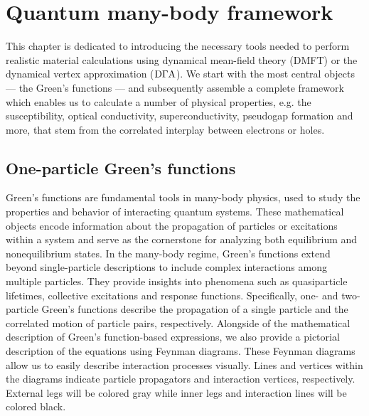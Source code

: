 \documentclass[../../main.tex]{subfiles}
\begin{document}
\sloppy

\chapter{Quantum many-body framework}\label{ch:quantum_many_body_framework}

This chapter is dedicated to introducing the necessary tools needed to perform realistic material calculations using dynamical mean-field theory (DMFT) or the dynamical vertex approximation ($\text{D}\Gamma\text{A}$). We start with the most central objects --- the Green's functions --- and subsequently assemble a complete framework which enables us to calculate a number of physical properties, e.g. the susceptibility, optical conductivity, superconductivity, pseudogap formation and more, that stem from the correlated interplay between electrons or holes.

\section{One-particle Green's functions}

Green's functions are fundamental tools in many-body physics, used to study the properties and behavior of interacting quantum systems. These mathematical objects encode information about the propagation of particles or excitations within a system and serve as the cornerstone for analyzing both equilibrium and nonequilibrium states. In the many-body regime, Green's functions extend beyond single-particle descriptions to include complex interactions among multiple particles. They provide insights into phenomena such as quasiparticle lifetimes, collective excitations and response functions. Specifically, one- and two-particle Green's functions describe the propagation of a single particle and the correlated motion of particle pairs, respectively. Alongside of the mathematical description of Green's function-based expressions, we also provide a pictorial description of the equations using Feynman diagrams. These Feynman diagrams allow us to easily describe interaction processes visually. Lines and vertices within the diagrams indicate particle propagators and interaction vertices, respectively. External legs will be colored gray while inner legs and interaction lines will be colored black.
\end{document}

